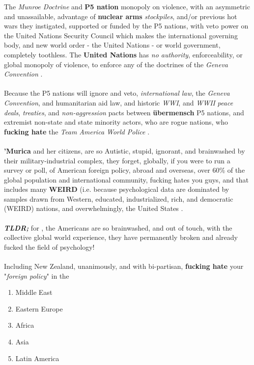 \documentclass[16pt,openany,oneside]{book}
\begin{document}
The \textit{Munroe Doctrine} and \textbf{P5 nation} monopoly on violence, with an asymmetric and unassailable, advantage of \textbf{nuclear arms} \textit{stockpiles}, and/or previous hot wars they instigated, supported or funded by the P5 nations, with veto power on the United Nations Security Council which makes the international governing body, and new world order - the United Nations - or world government, completely toothless.
The \textbf{United Nations} has \emph{no authority}, 
enforceability, or
global monopoly of violence, 
to enforce any of the doctrines of the \textit{Geneva Convention} \cite{toft2005john, unitednations2023twitter, pictet1952geneva}.
\\\\
Because the P5 nations will ignore and veto, 
\textit{international law}, the 
\textit{Geneva Convention}, and 
humanitarian aid law, and 
historic \textit{WWI}, and \textit{WWII}
\textit{peace deals}, \textit{treaties}, and \textit{non-aggression} pacts between \textbf{übermensch} P5 nations, 
and extremist non-state and state minority actors, who are rogue nations, who \textbf{fucking hate} the \textit{Team America World Police}  \cite{unitednations2023twitter, nietzsche1888thus, parker2005team}.
\\\\
\textbf{'Murica} and her citizens, are so Autistic, stupid, ignorant, and brainwashed by their military-industrial complex, they forget, globally, if you were to run a survey or poll, of American foreign policy, abroad and overseas, over 60\% of the global population and international community, fucking hates you guys, and that includes many \textbf{WEIRD} 
(i.e. because psychological data are dominated by samples drawn from Western, educated, industrialized, rich, and democratic (WEIRD) nations, and overwhelmingly, the United States \cite{muthukrishna2020beyondweird}.
\\\\
\textbf{\textit{TLDR;}} for \cite{muthukrishna2020beyondweird}, the Americans are so brainwashed, and out of touch, with the collective global world experience, they have permanently broken and already fucked the field of psychology! 
\\\\
Including New Zealand, unanimously, and with bi-partisan, \textbf{fucking hate} your "\textit{foreign policy}" in the 
\begin{enumerate}
    \item Middle East
    \item Eastern Europe
    \item Africa
    \item Asia
    \item Latin America
\end{enumerate}
\end{document}
